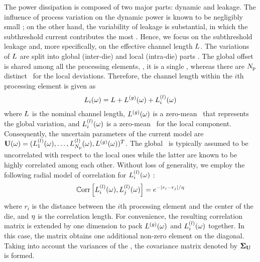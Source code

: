 The power dissipation is composed of two major parts: dynamic and leakage. The influence of process variation on the dynamic power is known to be negligibly small \cite{juan2011, juan2012, srivastava2010}; on the other hand, the variability of leakage is substantial, in which the subthreshold current contributes the most \cite{juan2011, juan2012}. Hence, we focus on the subthreshold leakage and, more specifically, on the effective channel length $L$. The variations of $L$ are split into global (inter-die) and local (intra-die) parts \cite{chandra2010, juan2011, juan2012, srivastava2010, shen2009}. The global offset is shared among all the processing elements, \ie, it is a single \rv, whereas there are ${N_\text{p}}$ distinct \rvs\ for the local deviations. Therefore, the channel length within the $i$th processing element is given as
\[
  L_i(\omega) = L + {L^{(g)}}(\omega) + L^{(l)}_i(\omega)
\]
where $L$ is the nominal channel length, ${L^{(g)}}(\omega)$ is a zero-mean \rv\ that represents the global variation, and $L^{(l)}_i(\omega)$ is a zero-mean \rv\ for the local component. Consequently, the uncertain parameters of the current model are $\mathbf{U}(\omega) = (L^{(l)}_1(\omega), \dotsc, L^{(l)}_{N_\text{p}}(\omega), {L^{(g)}}(\omega) )^T$. The global \rv\ is typically assumed to be uncorrelated with respect to the local ones while the latter are known to be highly correlated among each other. Without loss of generality, we employ the following radial model of correlation for $L^{(l)}_i(\omega)$ \cite{ghanem1991, cheng2011}:
\begin{equation} \elabel{correlation-matrix}
  \oCorr{\lLeff_i(\o), \lLeff_j(\o)} = e^{-|r_i - r_j|/\corrLength}
\end{equation}
where $r_i$ is the distance between the $i$th processing element and the center of the die, and $\eta$ is the correlation length. For convenience, the resulting correlation matrix is extended by one dimension to pack ${L^{(g)}}(\omega)$ and $L^{(l)}_i(\omega)$ together. In this case, the matrix obtains one additional non-zero element on the diagonal. Taking into account the variances of the \rvs, the covariance matrix denoted by $\mCov_\vU$ is formed.
